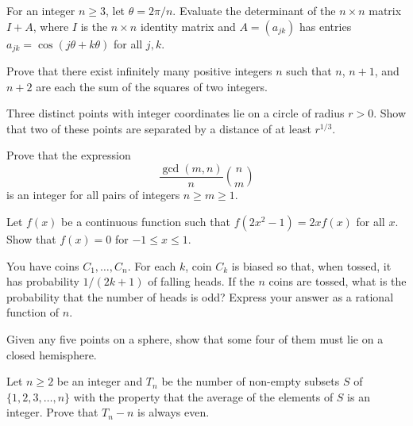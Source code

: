\documentclass[12pt]{article}
\begin{document}
    \begin{exercise}[1999 B5]
        For an integer $n\geqslant 3$, let $\theta = 2\pi / n$. Evaluate the determinant of the $n\times n$ matrix $I+A$, where $I$ is the $n\times n$ identity matrix and $A=(a_{jk})$ has entries $a_{jk} = \cos(j\theta+k\theta)$ for all $j,k$. 
    \end{exercise}

    \begin{exercise}[2000 A2]
        Prove that there exist infinitely many positive integers \(n\) such that \(n\), \(n+1\), and \(n+2\) are each the sum of the squares of two integers.
    \end{exercise}

    \begin{exercise}[2000 A5]
        Three distinct points with integer coordinates lie on a circle of radius $r>0$. Show that two of these points are separated by a distance of at least $r^{1/3}$.
    \end{exercise}

    \begin{exercise}[2000 B2]
        Prove that the expression
        \[\frac{\gcd(m,n)}{n}\binom{n}{m}\]
        is an integer for all pairs of integers \(n\geq m\geq 1\).
    \end{exercise}

    \begin{exercise}[2000 B4]
        Let $f(x)$ be a continuous function such that $f(2x^{2} - 1) = 2xf(x)$ for all $x$. Show that $f(x) = 0$ for $-1 \leq x \leq 1$. 
    \end{exercise}

    \begin{exercise}[2001 A2]
        You have coins \(C_1,\ldots,C_n\).
        For each \(k\), coin \(C_k\) is biased so that, when tossed, it has probability \(1/(2k+1)\) of falling heads.
        If the \(n\) coins are tossed, what is the probability that the number of heads is odd?
        Express your answer as a rational function of \(n\).
    \end{exercise}

    \begin{exercise}[2002 A2]
        Given any five points on a sphere, show that some four of them must lie on a closed hemisphere.
    \end{exercise}

    \begin{exercise}[2002 A3]
        Let $n\geqslant 2$ be an integer and $T_n$ be the number of non-empty subsets $S$ of $\{1, 2, 3, \dots, n\}$ with the property that the average of the elements of $S$ is an integer. Prove that $T_n - n$ is always even.
    \end{exercise}
\end{document}
